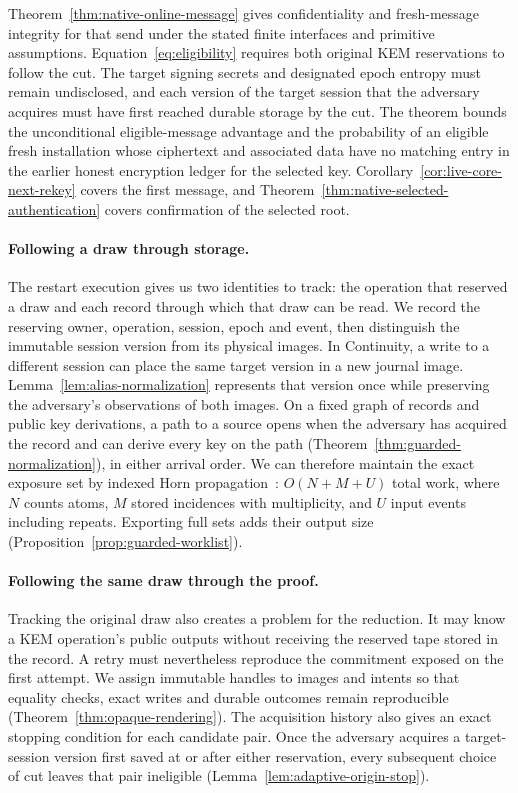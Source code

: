 \documentclass[pdflatex]{sn-jnl}
\theoremstyle{thmstyleone}
\theoremstyle{thmstylethree}
\theoremstyle{thmstyletwo}
\begin{document}
Theorem~\ref{thm:native-online-message} gives confidentiality and
fresh-message integrity for that send under the stated finite interfaces
and primitive assumptions. Equation~\eqref{eq:eligibility} requires
both original KEM reservations to follow the cut. The target signing
secrets and designated epoch entropy must remain undisclosed, and each
version of the target session that the adversary acquires must have
first reached durable storage by the cut. The theorem bounds the unconditional
eligible-message advantage and the probability of an eligible fresh
installation whose ciphertext and associated data have no matching
entry in the earlier honest encryption ledger for the selected key.
Corollary~\ref{cor:live-core-next-rekey} covers the first
message, and Theorem~\ref{thm:native-selected-authentication} covers
confirmation of the selected root.

\paragraph{Following a draw through storage.}
The restart execution gives us two identities to track: the operation
that reserved a draw and each record through which that draw can be
read. We record the reserving owner, operation, session, epoch and event,
then distinguish the immutable session version from its physical images.
In Continuity, a write to a different session can place the same target
version in a new journal image. Lemma~\ref{lem:alias-normalization}
represents that version once while preserving the adversary's
observations of both images. On a fixed graph of records and public
key derivations, a path to a source opens when the adversary
has acquired the record and can derive every key on the path
(Theorem~\ref{thm:guarded-normalization}), in either arrival order.
We can therefore maintain the exact exposure set by indexed Horn
propagation~\cite{dowlingGallier1984}: $O(N+M+U)$ total work, where
$N$ counts atoms, $M$ stored incidences with multiplicity, and $U$ input
events including repeats. Exporting full sets adds their output size
(Proposition~\ref{prop:guarded-worklist}).

\paragraph{Following the same draw through the proof.}
Tracking the original draw also creates a problem for the reduction.
It may know a KEM operation's public outputs without receiving the
reserved tape stored in the record. A retry must nevertheless
reproduce the commitment exposed on the first attempt. We assign
immutable handles to images and intents so that equality checks, exact
writes and durable outcomes remain reproducible
(Theorem~\ref{thm:opaque-rendering}). The acquisition history also gives
an exact stopping condition for each candidate pair. Once the adversary
acquires a target-session version first saved at or after either
reservation, every subsequent choice of cut leaves that pair ineligible
(Lemma~\ref{lem:adaptive-origin-stop}).
\end{document}
